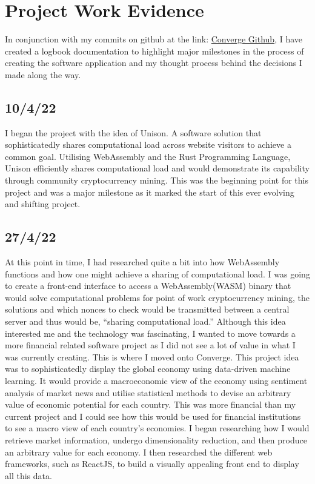 \let\textcircled=\pgftextcircled
\chapter{Project Work Evidence}
In conjunction with my commits on github at the link: \href{https://github.com/alexjgreig/converge}{Converge Github}, I have created a logbook documentation to highlight major milestones in the process of creating the software application and my thought process behind the decisions I made along the way. \\

\section{10/4/22}
I began the project with the idea of Unison. A software solution that sophisticatedly shares computational load across website visitors to achieve a common goal. Utilising WebAssembly and the Rust Programming Language, Unison efficiently shares computational load and would demonstrate its capability through community cryptocurrency mining. This was the beginning point for this project and was a major milestone as it marked the start of this ever evolving and shifting project. \\
\section{27/4/22}
At this point in time, I had researched quite a bit into how WebAssembly functions and how one might achieve a sharing of computational load. I was going to create a front-end interface to access a WebAssembly(WASM) binary that would solve computational problems for point of work cryptocurrency mining, the solutions and which nonces to check would be transmitted between a central server and thus would be, “sharing computational load.” Although this idea interested me and the technology was fascinating, I wanted to move towards a more financial related software project as I did not see a lot of value in what I was currently creating. This is where I moved onto Converge. This project idea was to sophisticatedly display the global economy using data-driven machine learning. It would provide a macroeconomic view of the economy using sentiment analysis of market news and utilise statistical methods to devise an arbitrary value of economic potential for each country. This was more financial than my current project and I could see how this would be used for financial institutions to see a macro view of each country’s economies. I began researching how I would retrieve market information, undergo dimensionality reduction, and then produce an arbitrary value for each economy. I then researched the different web frameworks, such as ReactJS, to build a visually appealing front end to display all this data. \\
